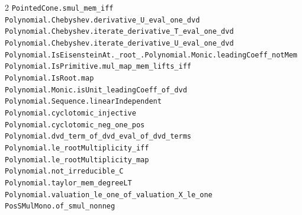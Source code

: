 \documentclass[10pt,a4paper]{article}
\begin{document}
\begin{multicols}{2}
\texttt{PointedCone.\allowbreak{}smul\_mem\_iff} \\
\texttt{Polynomial.\allowbreak{}Chebyshev.\allowbreak{}derivative\_U\_eval\_one\_dvd} \\
\texttt{Polynomial.\allowbreak{}Chebyshev.\allowbreak{}iterate\_derivative\_T\_eval\_one\_dvd} \\
\texttt{Polynomial.\allowbreak{}Chebyshev.\allowbreak{}iterate\_derivative\_U\_eval\_one\_dvd} \\
\texttt{Polynomial.\allowbreak{}IsEisensteinAt.\allowbreak{}\_root\_.\allowbreak{}Polynomial.\allowbreak{}Monic.\allowbreak{}leadingCoeff\_notMem} \\
\texttt{Polynomial.\allowbreak{}IsPrimitive.\allowbreak{}mul\_map\_mem\_lifts\_iff} \\
\texttt{Polynomial.\allowbreak{}IsRoot.\allowbreak{}map} \\
\texttt{Polynomial.\allowbreak{}Monic.\allowbreak{}isUnit\_leadingCoeff\_of\_dvd} \\
\texttt{Polynomial.\allowbreak{}Sequence.\allowbreak{}linearIndependent} \\
\texttt{Polynomial.\allowbreak{}cyclotomic\_injective} \\
\texttt{Polynomial.\allowbreak{}cyclotomic\_neg\_one\_pos} \\
\texttt{Polynomial.\allowbreak{}dvd\_term\_of\_dvd\_eval\_of\_dvd\_terms} \\
\texttt{Polynomial.\allowbreak{}le\_rootMultiplicity\_iff} \\
\texttt{Polynomial.\allowbreak{}le\_rootMultiplicity\_map} \\
\texttt{Polynomial.\allowbreak{}not\_irreducible\_C} \\
\texttt{Polynomial.\allowbreak{}taylor\_mem\_degreeLT} \\
\texttt{Polynomial.\allowbreak{}valuation\_le\_one\_of\_valuation\_X\_le\_one} \\
\texttt{PosSMulMono.\allowbreak{}of\_smul\_nonneg} \\

\end{multicols}
\end{document}
